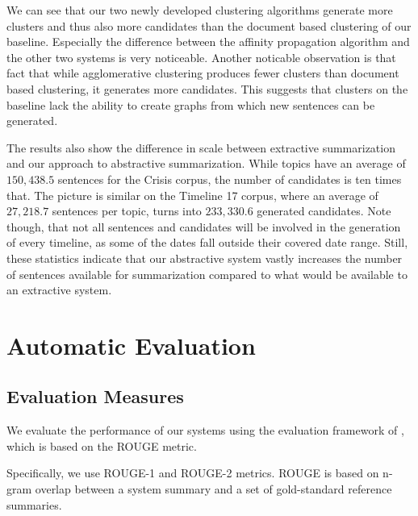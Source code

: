 \documentclass[a4paper,BCOR=10mm]{report}
\numberwithin{lemma}{chapter}
\numberwithin{definition}{chapter}
\begin{document}
We can see that our two newly developed clustering algorithms generate more clusters and thus also more candidates than the document based clustering of our baseline. Especially the difference between the affinity propagation algorithm and the other two systems is very noticeable.
Another noticable observation is that fact that while agglomerative clustering produces fewer clusters than document based clustering, it generates more candidates. This suggests that clusters on the baseline lack the ability to create graphs from which new sentences can be generated.

The results also show the difference in scale between extractive summarization and our approach to abstractive summarization.
While topics have an average of $150,438.5$ sentences for the Crisis corpus, the number of candidates is ten times that.
The picture is similar on the Timeline 17 corpus, where an average of $27,218.7$ sentences per topic, turns into $233,330.6$ generated candidates. Note though, that not all sentences and candidates will be involved in the generation of every timeline, as some of the dates fall outside their covered date range.
Still, these statistics indicate that our abstractive system vastly increases the number of sentences available for summarization compared to what would be available to an extractive system.


%
%

\chapter{Automatic Evaluation} \label{sec:results-auto}

\section{Evaluation Measures} \label{sec:evaluation-auto-setup}

We evaluate the performance of our systems using the evaluation framework of \citet{tilse}, which is based on the ROUGE \citep{rouge} metric.

Specifically, we use ROUGE-1 and ROUGE-2 metrics.
ROUGE is based on n-gram overlap between a system summary and a set of gold-standard reference summaries.
\end{document}
